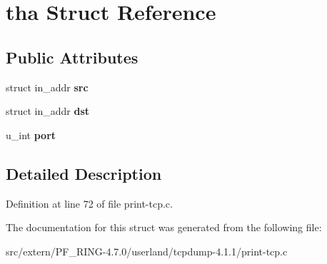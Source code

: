\hypertarget{structtha}{
\section{tha Struct Reference}
\label{structtha}
}
\subsection*{Public Attributes}
\begin{DoxyCompactItemize}
\item 
\hypertarget{structtha_a7a3edd62f579fcfeb2204942615dec96}{
struct in\_\-addr {\bfseries src}}
\label{structtha_a7a3edd62f579fcfeb2204942615dec96}

\item 
\hypertarget{structtha_a153fa6db2143b763c8762a033a77f86c}{
struct in\_\-addr {\bfseries dst}}
\label{structtha_a153fa6db2143b763c8762a033a77f86c}

\item 
\hypertarget{structtha_a875d41d2b9390efd35ebdc20d3c3959d}{
u\_\-int {\bfseries port}}
\label{structtha_a875d41d2b9390efd35ebdc20d3c3959d}

\end{DoxyCompactItemize}


\subsection{Detailed Description}


Definition at line 72 of file print-\/tcp.c.



The documentation for this struct was generated from the following file:\begin{DoxyCompactItemize}
\item 
src/extern/PF\_\-RING-\/4.7.0/userland/tcpdump-\/4.1.1/print-\/tcp.c\end{DoxyCompactItemize}
